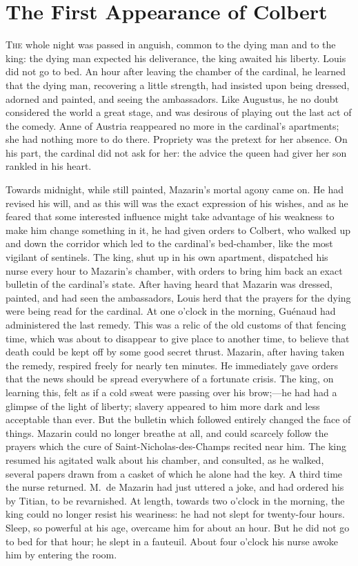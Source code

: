 \chapter{The First Appearance of Colbert}

\lettrine{T}{he} whole night was passed in anguish, common to the dying man and to the king: the dying man expected his deliverance, the king awaited his liberty. Louis did not go to bed. An hour after leaving the chamber of the cardinal, he learned that the dying man, recovering a little strength, had insisted upon being dressed, adorned and painted, and seeing the ambassadors. Like Augustus, he no doubt considered the world a great stage, and was desirous of playing out the last act of the comedy. Anne of Austria reappeared no more in the cardinal's apartments; she had nothing more to do there. Propriety was the pretext for her absence. On his part, the cardinal did not ask for her: the advice the queen had giver her son rankled in his heart.

Towards midnight, while still painted, Mazarin's mortal agony came on. He had revised his will, and as this will was the exact expression of his wishes, and as he feared that some interested influence might take advantage of his weakness to make him change something in it, he had given orders to Colbert, who walked up and down the corridor which led to the cardinal's bed-chamber, like the most vigilant of sentinels. The king, shut up in his own apartment, dispatched his nurse every hour to Mazarin's chamber, with orders to bring him back an exact bulletin of the cardinal's state. After having heard that Mazarin was dressed, painted, and had seen the ambassadors, Louis herd that the prayers for the dying were being read for the cardinal. At one o'clock in the morning, Guénaud had administered the last remedy. This was a relic of the old customs of that fencing time, which was about to disappear to give place to another time, to believe that death could be kept off by some good secret thrust. Mazarin, after having taken the remedy, respired freely for nearly ten minutes. He immediately gave orders that the news should be spread everywhere of a fortunate crisis. The king, on learning this, felt as if a cold sweat were passing over his brow;—he had had a glimpse of the light of liberty; slavery appeared to him more dark and less acceptable than ever. But the bulletin which followed entirely changed the face of things. Mazarin could no longer breathe at all, and could scarcely follow the prayers which the cure of Saint-Nicholas-des-Champs recited near him. The king resumed his agitated walk about his chamber, and consulted, as he walked, several papers drawn from a casket of which he alone had the key. A third time the nurse returned. M.~de Mazarin had just uttered a joke, and had ordered his  by Titian, to be revarnished. At length, towards two o'clock in the morning, the king could no longer resist his weariness: he had not slept for twenty-four hours. Sleep, so powerful at his age, overcame him for about an hour. But he did not go to bed for that hour; he slept in a fauteuil. About four o'clock his nurse awoke him by entering the room.

